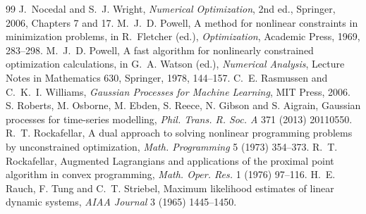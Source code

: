 \begin{thebibliography}{99}
 J.~Nocedal and S.~J. Wright, \emph{Numerical Optimization}, 2nd ed., Springer,
2006, Chapters 7 and 17.
 M.~J.~D. Powell, A method for nonlinear constraints in minimization problems,
in R.~Fletcher (ed.), \emph{Optimization}, Academic Press, 1969, 283--298.
 M.~J.~D. Powell, A fast algorithm for nonlinearly constrained optimization
calculations, in G.~A. Watson (ed.), \emph{Numerical Analysis}, Lecture Notes in
Mathematics 630, Springer, 1978, 144--157.
 C.~E. Rasmussen and C.~K.~I. Williams, \emph{Gaussian Processes for Machine Learning},
  MIT Press, 2006.
 S. Roberts, M. Osborne, M. Ebden, S. Reece, N. Gibson and S. Aigrain,
  Gaussian processes for time-series modelling, \emph{Phil. Trans. R. Soc. A} 371 (2013) 20110550.
 R.~T. Rockafellar, A dual approach to solving nonlinear programming problems by
unconstrained optimization, \emph{Math. Programming} 5 (1973) 354--373.
 R.~T. Rockafellar, Augmented Lagrangians and applications of the proximal point
algorithm in convex programming, \emph{Math. Oper. Res.} 1 (1976) 97--116.
 H.~E. Rauch, F. Tung and C.~T. Striebel, Maximum likelihood estimates of linear dynamic systems,
  \emph{AIAA Journal} 3 (1965) 1445--1450.
\end{thebibliography}
